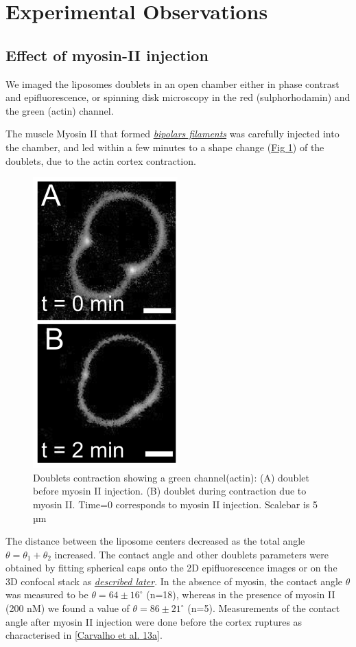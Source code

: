 \documentclass[A4paperpaper,11pt,english]{sphinxmanual}
\begin{document}
\section{Experimental Observations}
\label{parts/part4:experimental-observations}

\subsection{Effect of myosin-II injection}
\label{parts/part4:effect-of-myosin-ii-injection}
We imaged the liposomes doublets in an open chamber either in phase contrast
and epifluorescence, or spinning disk microscopy in the red (sulphorhodamin)
and the green (actin) channel.

The muscle Myosin II that formed {\hyperref[parts/part1:myoii]{\emph{bipolars filaments}}} was carefully injected into
the chamber, and led within a few minutes to a shape change (\hyperref[parts/part4:doublets-contraction]{Fig  \ref*{parts/part4:doublets-contraction}})
of the doublets, due to the actin cortex contraction.
\begin{figure}[htbp]
\centering
\capstart

\includegraphics[width=0.300\linewidth]{doublet-contract.png}
\caption{Doublets contraction showing a green channel(actin): (A) doublet before
myosin II injection. (B) doublet during contraction due to myosin II. Time=0 corresponds to myosin II injection.
Scalebar is 5 µm}\label{parts/part4:doublets-contraction}\end{figure}

The distance between the liposome centers decreased as the total angle \(\theta
= \theta_1+\theta_2\) increased. The contact angle and other doublets parameters were obtained by fitting spherical caps onto the 2D epifluorescence
images or on the 3D confocal stack as {\hyperref[parts/part4:full3dfit]{\emph{described later}}}.  In the absence of myosin, the
contact angle \(\theta\) was measured to be \(\theta = 64 \pm 16 ^{\circ}\) (n=18), whereas in
the presence of myosin II (200 nM) we found  a value of \(\theta = 86 \pm 21
^{\circ}\) (n=5). Measurements of the contact angle after myosin II injection were done before the cortex
ruptures as characterised in {\hyperref[parts/part4:carvalho2013a]{{[}Carvalho et al. 13a{]}}}.
\end{document}
